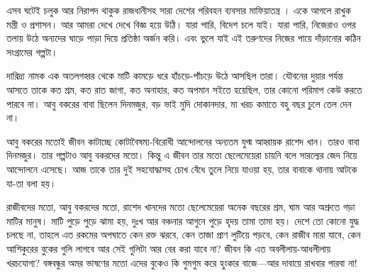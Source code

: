 \documentclass{article}
\begin{document}
এসব ঘটেই চলুক আর নিরাপদ থাকুক রাজধানীসহ সারা দেশের পরিবহন ব্যবসার মাফিয়াতন্ত্র । একে আগলে রাখুক মন্ত্রী ও প্রশাসন। আর আমরা দেখে দেখে বিজ্ঞ হয়ে উঠি। যারা পারি, বিদেশ চলে যাই। যারা পারি, নিজেরাও ওপর তলায় উঠে অন্যদের ঘাড়ে পাড়া দিয়ে প্রতিষ্ঠা অর্জন করি। এবং ভুলে যাই এই তরুণদের নিজের পায়ে দাঁড়ানোর কঠিন সংগ্রামের গল্পটা। 

দারিদ্র্য নামক এক অতলগহ্বর থেকে মাটি কামড়ে ধরে হাঁচড়ে-পাঁচড়ে উঠে আসছিল তারা। যৌবনের দুয়ার পর্যন্ত আসতে তাকে কত শ্রম, কত রাত জাগা, কত অনাহার, কত অপমান সইতে হয়েছিল, তার কোনো পরিমাপ কেউ করতে পারবে না। আবু বকরের বাবা ছিলেন দিনমজুর, বড় ভাই মুদি দোকানদার, মা খরচ কমাতে বহু বছর চুলে তেল দেন না।

আবু বকরের মতোই জীবন কাটাচ্ছে কোটাবৈষম্য-বিরোধী আন্দোলনের অন্যতম যুগ্ম আহ্বায়ক রাশেদ খান। তারও বাবা দিনমজুর। তার গল্পটাও আবু বকরদের মতো। কিন্তু এ জীবন তার মতো ছেলেমেয়েরা চায়নি বলে সারল্যের জেদ নিয়ে আন্দোলনে এসেছে। আজ তাকে তার দুই সহযোদ্ধাসহ চোখ বেঁধে তুলে নিয়ে যাওয়া হয়, তার বাবাকে থানায় আটকে যা-তা বলা হয়।

রাজীবদের মতো, আবু বকরদের মতো, রাশেদ খানদের মতো ছেলেমেয়েরা অনেক বছরের শ্রম, ঘাম আর অশ্রুতে গড়া মাটির মানুষ। মাটি পুড়ে পুড়ে ঝামা হয়, দুঃখ আর বঞ্চনার আগুনে পুড়ে হৃদয় তামা তামা হয়। দেশে তো কোনো যুদ্ধ চলছে না, তাহলে এত রকমের অপঘাতে কেন রক্ত ঝরবে, কেন তাজা প্রাণ লুটিয়ে পড়বে, কেন রাজীব মারা যাবে, কেন আশিকুরের বুকের গুলি লাগবে আর সেই গুলিটা আর বের করা যাবে না? জীবন কি এত অবলীলায়-আধলীলায় খরচযোগ্য? বঙ্গবন্ধুর অমর ভাষণের মতো এদের বুকেও কি গুমগুম করে হুংকার বাজে—আর দাবায়ে রাখবার পারবা না!
\end{document}
